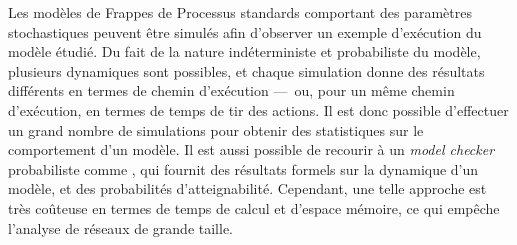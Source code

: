 Les modèles de Frappes de Processus standards comportant des paramètres stochastiques
peuvent être simulés afin d'observer un exemple d'exécution du modèle étudié.
Du fait de la nature indéterministe et probabiliste du modèle, plusieurs dynamiques
sont possibles, et chaque simulation donne des résultats différents en termes
de chemin d'exécution ---~ou, pour un même chemin d'exécution,
en termes de temps de tir des actions.
Il est donc possible d'effectuer un grand nombre de simulations pour obtenir des
statistiques sur le comportement d'un modèle.
Il est aussi possible de recourir à un \textit{model checker} probabiliste
comme , qui fournit des résultats formels sur la dynamique d'un modèle,
et des probabilités d'atteignabilité.
Cependant, une telle approche est très coûteuse en termes de temps de calcul
et d'espace mémoire, ce qui empêche l'analyse de réseaux de grande taille.
